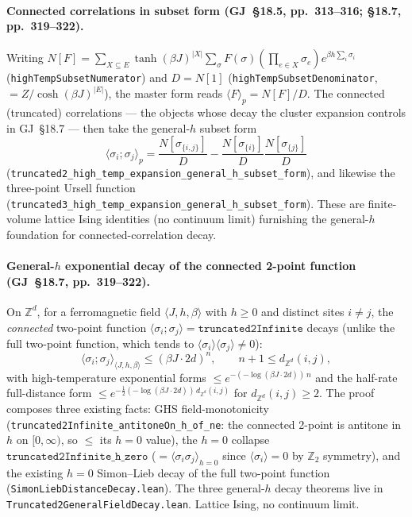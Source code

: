 \documentclass[a4paper,11pt]{article}
\begin{document}
\paragraph{Connected correlations in subset form (GJ~\S18.5, pp.~313--316;
\S18.7, pp.~319--322).}
Writing
\(N[F] = \sum_{X\subseteq E}\tanh(\beta J)^{|X|}\sum_\sigma F(\sigma)(\prod_{e\in X}\sigma_e)e^{\beta h\sum_i\sigma_i}\)
(\texttt{highTempSubsetNumerator}) and \(D = N[1]\)
(\texttt{highTempSubsetDenominator}, \(= Z/\cosh(\beta J)^{|E|}\)), the master
form reads \(\langle F\rangle_p = N[F]/D\). The connected (truncated)
correlations — the objects whose decay the cluster expansion controls in
GJ~\S18.7 — then take the general-\(h\) subset form
\[
\langle\sigma_i;\sigma_j\rangle_p
  = \frac{N[\sigma_{\{i,j\}}]}{D} - \frac{N[\sigma_{\{i\}}]}{D}\frac{N[\sigma_{\{j\}}]}{D}
\]
(\texttt{truncated2\_high\_temp\_expansion\_general\_h\_subset\_form}), and
likewise the three-point Ursell function
(\texttt{truncated3\_high\_temp\_expansion\_general\_h\_subset\_form}). These
are finite-volume lattice Ising identities (no continuum limit) furnishing the
general-\(h\) foundation for connected-correlation decay.

\paragraph{General-\(h\) exponential decay of the connected 2-point function
(GJ~\S18.7, pp.~319--322).} On \(\mathbb{Z}^d\), for a ferromagnetic field
\(\langle J,h,\beta\rangle\) with \(h\ge 0\) and distinct sites \(i\neq j\), the
\emph{connected} two-point function \(\langle\sigma_i;\sigma_j\rangle =
\texttt{truncated2Infinite}\) decays (unlike the full two-point function, which
tends to \(\langle\sigma_i\rangle\langle\sigma_j\rangle\neq 0\)):
\[
\langle\sigma_i;\sigma_j\rangle_{\langle J,h,\beta\rangle}
  \le (\beta J\cdot 2d)^n,\qquad n+1\le d_{\mathbb{Z}^d}(i,j),
\]
with high-temperature exponential forms
\(\le e^{-(-\log(\beta J\cdot 2d))\,n}\) and the half-rate full-distance form
\(\le e^{-\tfrac12(-\log(\beta J\cdot 2d))\,d_{\mathbb{Z}^d}(i,j)}\) for
\(d_{\mathbb{Z}^d}(i,j)\ge 2\). The proof composes three existing facts: GHS
field-monotonicity (\texttt{truncated2Infinite\_antitoneOn\_h\_of\_ne}: the
connected 2-point is antitone in \(h\) on \([0,\infty)\), so
\(\le\) its \(h=0\) value), the \(h=0\) collapse
\(\texttt{truncated2Infinite\_h\_zero}\) (\(=\langle\sigma_i\sigma_j\rangle_{h=0}\)
since \(\langle\sigma_i\rangle=0\) by \(\mathbb{Z}_2\) symmetry), and the
existing \(h=0\) Simon--Lieb decay of the full two-point function
(\texttt{SimonLiebDistanceDecay.lean}). The three general-\(h\) decay theorems
live in \texttt{Truncated2GeneralFieldDecay.lean}. Lattice Ising, no continuum
limit.
\end{document}
